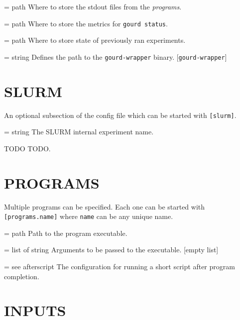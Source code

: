 \documentclass[a4paper,english]{article}
\begin{document}
\begin{adjustwidth}{18pt}{0pt}
    \begin{Description}[Options]\setlength{\itemsep}{0cm}
        \item[\Opt{output\_path} = path] Where to store the stdout files from the \emph{programs}.
        \item[\Opt{metrics\_path} = path] Where to store the metrics for \texttt{gourd status}.
        \item[\Opt{experiments\_folder} = path] Where to store state of previously ran experiments.
        \item[\oOpt{wrapper} = string] Defines the path to the \texttt{gourd-wrapper} binary. [\texttt{gourd-wrapper}]
    \end{Description}


    \section{SLURM}

      An optional subsection of the config file which can be started with \texttt{[slurm]}.

      \begin{Description}[Options]\setlength{\itemsep}{0cm}
          \item[\Opt{experiment\_name} = string] The SLURM internal experiment name.
          \item[TODO] TODO.
      \end{Description}


    \section{PROGRAMS}

      Multiple programs can be specified. Each one can be started with \texttt{[programs.name]} where \texttt{name} can be any unique name.

      \begin{Description}[Options]\setlength{\itemsep}{0cm}
          \item[\Opt{binary} = path] Path to the program executable.
          \item[\oOpt{arguments} = list of string] Arguments to be passed to the executable. [empty list]
          \item[\oOpt{afterscript} = see afterscript] The configuration for running a short script after program completion.
      \end{Description}

    \section{INPUTS}


\end{adjustwidth}
\end{document}
